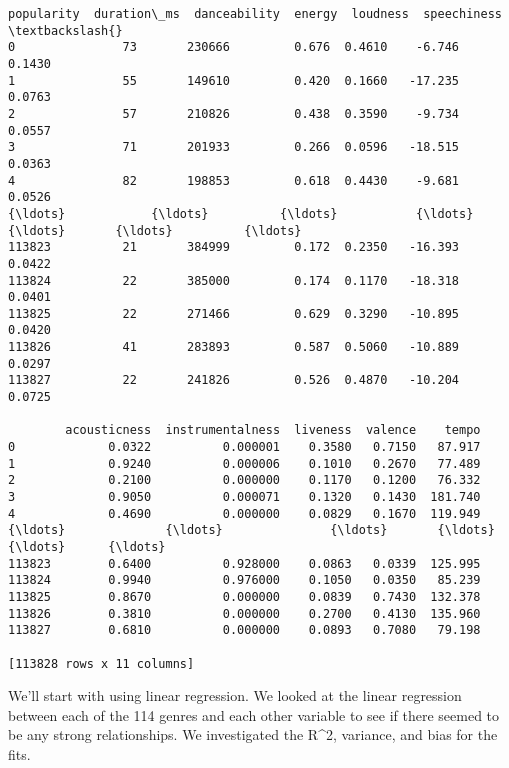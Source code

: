 \documentclass[11pt]{article}
\makeatletter
\newcommand{\boxspacing}{\kern\kvtcb@left@rule\kern\kvtcb@boxsep}
\newcommand{\prompt}[4]{
        {\ttfamily\llap{{\color{#2}[#3]:\hspace{3pt}#4}}\vspace{-\baselineskip}}
    }
\makeatother
\begin{document}
            \begin{tcolorbox}[breakable, size=fbox, boxrule=.5pt, pad at break*=1mm, opacityfill=0]
\prompt{Out}{outcolor}{56}{\boxspacing}
\begin{Verbatim}[commandchars=\\\{\}]
        popularity  duration\_ms  danceability  energy  loudness  speechiness  \textbackslash{}
0               73       230666         0.676  0.4610    -6.746       0.1430
1               55       149610         0.420  0.1660   -17.235       0.0763
2               57       210826         0.438  0.3590    -9.734       0.0557
3               71       201933         0.266  0.0596   -18.515       0.0363
4               82       198853         0.618  0.4430    -9.681       0.0526
{\ldots}            {\ldots}          {\ldots}           {\ldots}     {\ldots}       {\ldots}          {\ldots}
113823          21       384999         0.172  0.2350   -16.393       0.0422
113824          22       385000         0.174  0.1170   -18.318       0.0401
113825          22       271466         0.629  0.3290   -10.895       0.0420
113826          41       283893         0.587  0.5060   -10.889       0.0297
113827          22       241826         0.526  0.4870   -10.204       0.0725

        acousticness  instrumentalness  liveness  valence    tempo
0             0.0322          0.000001    0.3580   0.7150   87.917
1             0.9240          0.000006    0.1010   0.2670   77.489
2             0.2100          0.000000    0.1170   0.1200   76.332
3             0.9050          0.000071    0.1320   0.1430  181.740
4             0.4690          0.000000    0.0829   0.1670  119.949
{\ldots}              {\ldots}               {\ldots}       {\ldots}      {\ldots}      {\ldots}
113823        0.6400          0.928000    0.0863   0.0339  125.995
113824        0.9940          0.976000    0.1050   0.0350   85.239
113825        0.8670          0.000000    0.0839   0.7430  132.378
113826        0.3810          0.000000    0.2700   0.4130  135.960
113827        0.6810          0.000000    0.0893   0.7080   79.198

[113828 rows x 11 columns]
\end{Verbatim}
\end{tcolorbox}
        
    We'll start with using linear regression. We looked at the linear
regression between each of the 114 genres and each other variable to see
if there seemed to be any strong relationships. We investigated the
R\^{}2, variance, and bias for the fits.
\end{document}
